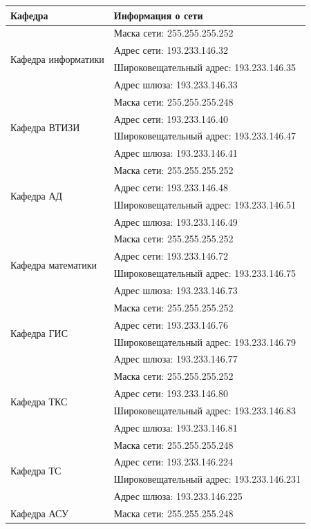 \documentclass[a4paper]{article}
\begin{document}
\begin{center}
\begin{longtable}{|l|l|}
\hline
Кафедра&Информация о сети\\
\hline
\multirow{4}{*}{Кафедра информатики}&Маска сети: 255.255.255.252\\
&Адрес сети: 193.233.146.32\\
&Широковещательный адрес: 193.233.146.35\\
&Адрес шлюза: 193.233.146.33\\
\hline
\multirow{4}{*}{Кафедра ВТИЗИ}&Маска сети: 255.255.255.248\\
&Адрес сети: 193.233.146.40\\
&Широковещательный адрес: 193.233.146.47\\
&Адрес шлюза: 193.233.146.41\\
\hline
\multirow{4}{*}{Кафедра АД}&Маска сети: 255.255.255.252\\
&Адрес сети: 193.233.146.48\\
&Широковещательный адрес: 193.233.146.51\\
&Адрес шлюза: 193.233.146.49\\
\hline
\multirow{4}{*}{Кафедра математики}&Маска сети: 255.255.255.252\\
&Адрес сети: 193.233.146.72\\
&Широковещательный адрес: 193.233.146.75\\
&Адрес шлюза: 193.233.146.73\\
\hline
\multirow{4}{*}{Кафедра ГИС}&Маска сети: 255.255.255.252\\
&Адрес сети: 193.233.146.76\\
&Широковещательный адрес: 193.233.146.79\\
&Адрес шлюза: 193.233.146.77\\
\hline
\multirow{4}{*}{Кафедра ТКС}&Маска сети: 255.255.255.252\\
&Адрес сети: 193.233.146.80\\
&Широковещательный адрес: 193.233.146.83\\
&Адрес шлюза: 193.233.146.81\\
\hline
\multirow{4}{*}{Кафедра ТС}&Маска сети: 255.255.255.248\\
&Адрес сети: 193.233.146.224\\
&Широковещательный адрес: 193.233.146.231\\
&Адрес шлюза: 193.233.146.225\\
\hline
\multirow{4}{*}{Кафедра АСУ}&Маска сети: 255.255.255.248\\

\end{longtable}
\end{center}
\end{document}
